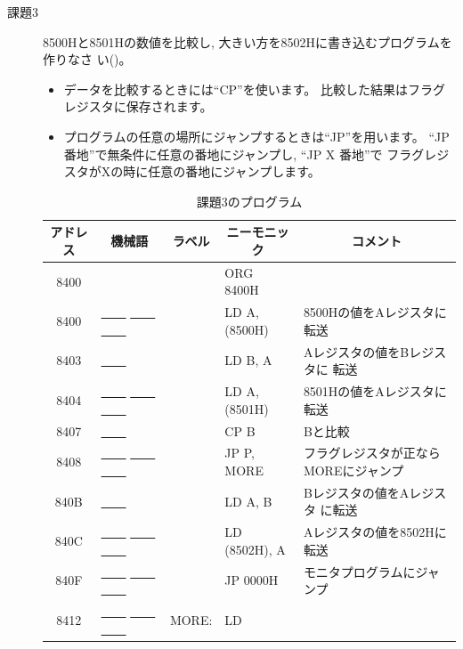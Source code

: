 \begin{description}
\item[課題3] 8500Hと8501Hの数値を比較し, 大きい方を8502Hに書き込むプログラムを作りなさ
      い()。


\begin{itemize}
\item データを比較するときには``CP''を使います。
比較した結果はフラグレジスタに保存されます。

\item プログラムの任意の場所にジャンプするときは``JP''を用います。
``JP 番地''で無条件に任意の番地にジャンプし, ``JP X 番地''で
フラグレジスタがXの時に任意の番地にジャンプします。
\end{itemize}


\begin{table}
\begin{center}
\caption{課題3のプログラム}
\label{tab:q1-3}
\small
\begin{tabular}{|c|l|ll|l|}
\hline
アドレス& \multicolumn{1}{|c|}{機械語}&\multicolumn{1}{|c}{ラベル}&\multicolumn{1}{c|}{ニーモニック}&\multicolumn{1}{|c|}{コメント}\\
\hline
   8400&             &        &ORG 8400H&\\
   8400&   \underline{~~~~} \underline{~~~~} \underline{~~~~}  &        &LD A,
                (8500H)& 8500Hの値をAレジスタに転送\\
   8403&   \underline{~~~~}        &        &LD B, A& Aレジスタの値をBレジスタに
                    転送\\
   8404&   \underline{~~~~} \underline{~~~~} \underline{~~~~}  &        &LD A,
                (8501H)& 8501Hの値をAレジスタに転送\\
   8407&   \underline{~~~~}         &        &CP B& Bと比較\\
   8408&   \underline{~~~~} \underline{~~~~} \underline{~~~~}   &        &JP P,
                MORE& フラグレジスタが正ならMOREにジャンプ\\
   840B&   \underline{~~~~}         &        &LD A, B& Bレジスタの値をAレジスタ
                    に転送\\
   840C&   \underline{~~~~} \underline{~~~~} \underline{~~~~}   &        &LD
                (8502H), A& Aレジスタの値を8502Hに転送\\
   840F&   \underline{~~~~} \underline{~~~~} \underline{~~~~}   &        &JP
                0000H& モニタプログラムにジャンプ\\
   8412&   \underline{~~~~} \underline{~~~~} \underline{~~~~}  &    MORE:&    LD

\end{tabular}
\end{center}
\end{table}
\end{description}
